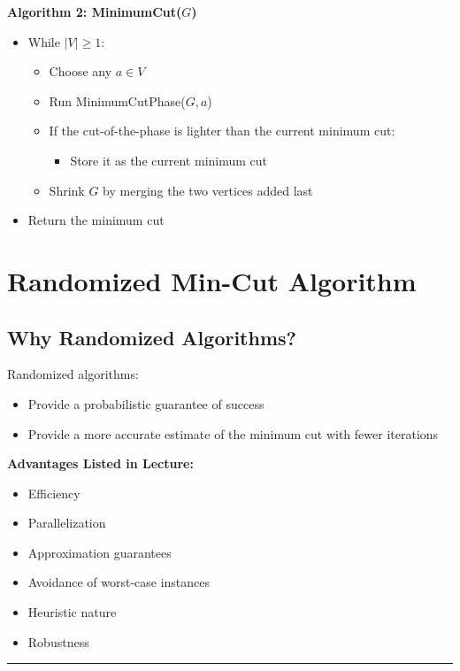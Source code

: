 \documentclass[12pt]{article}
\begin{document}
\textbf{Algorithm 2: MinimumCut(\( G \))}

\begin{itemize}
    \item While \( |V| \geq 1 \):
    \begin{itemize}
        \item Choose any \( a \in V \)
        \item Run MinimumCutPhase(\( G, a \))
        \item If the cut-of-the-phase is lighter than the current minimum cut:
        \begin{itemize}
            \item Store it as the current minimum cut
        \end{itemize}
        \item Shrink \( G \) by merging the two vertices added last
    \end{itemize}
    \item Return the minimum cut
\end{itemize}

\section{Randomized Min-Cut Algorithm}

\subsection{Why Randomized Algorithms?}

Randomized algorithms:
\begin{itemize}
    \item Provide a probabilistic guarantee of success
    \item Provide a more accurate estimate of the minimum cut with fewer iterations
\end{itemize}

\textbf{Advantages Listed in Lecture:}
\begin{itemize}
    \item Efficiency
    \item Parallelization
    \item Approximation guarantees
    \item Avoidance of worst-case instances
    \item Heuristic nature
    \item Robustness
\end{itemize}

\hrule
\vspace{1em}
\end{document}
